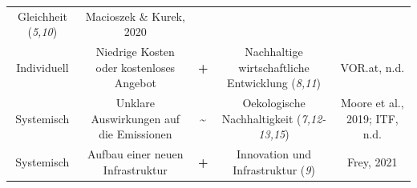 \documentclass[
]{book}
\begin{document}
\begin{longtable}[]{@{}ccccc@{}}
\begin{minipage}[t]{0.17\columnwidth}
Gleichheit (\emph{5,10})\strut
\end{minipage} & \begin{minipage}[t]{0.17\columnwidth}\centering
Macioszek \& Kurek, 2020\strut
\end{minipage}\tabularnewline
\begin{minipage}[t]{0.17\columnwidth}\centering
Individuell\strut
\end{minipage} & \begin{minipage}[t]{0.16\columnwidth}\centering
Niedrige Kosten oder kostenloses Angebot\strut
\end{minipage} & \begin{minipage}[t]{0.17\columnwidth}\centering
\textbf{+}\strut
\end{minipage} & \begin{minipage}[t]{0.17\columnwidth}\centering
Nachhaltige wirtschaftliche Entwicklung (\emph{8,11})\strut
\end{minipage} & \begin{minipage}[t]{0.17\columnwidth}\centering
VOR.at, n.d.\strut
\end{minipage}\tabularnewline
\begin{minipage}[t]{0.17\columnwidth}\centering
Systemisch\strut
\end{minipage} & \begin{minipage}[t]{0.16\columnwidth}\centering
Unklare Auswirkungen auf die Emissionen\strut
\end{minipage} & \begin{minipage}[t]{0.17\columnwidth}\centering
\textbf{\textasciitilde{}}\strut
\end{minipage} & \begin{minipage}[t]{0.17\columnwidth}\centering
Oekologische Nachhaltigkeit (\emph{7,12-13,15})\strut
\end{minipage} & \begin{minipage}[t]{0.17\columnwidth}\centering
Moore et al., 2019; ITF, n.d.\strut
\end{minipage}\tabularnewline
\begin{minipage}[t]{0.17\columnwidth}\centering
Systemisch\strut
\end{minipage} & \begin{minipage}[t]{0.16\columnwidth}\centering
Aufbau einer neuen Infrastruktur\strut
\end{minipage} & \begin{minipage}[t]{0.17\columnwidth}\centering
\textbf{+}\strut
\end{minipage} & \begin{minipage}[t]{0.17\columnwidth}\centering
Innovation und Infrastruktur (\emph{9})\strut
\end{minipage} & \begin{minipage}[t]{0.17\columnwidth}\centering
Frey, 2021\strut
\end{minipage}\tabularnewline
\bottomrule
\end{longtable}
\end{document}

